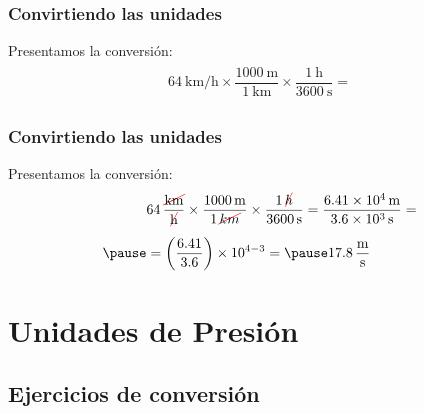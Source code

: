 \documentclass[14pt]{beamer}
\begin{document}
\begin{frame}
\frametitle{Convirtiendo las unidades}
Presentamos la conversión:
\pause
\begin{eqnarray*}
\begin{aligned}
\SI[per-mode=fraction]{64}{\kilo\meter\per\hour} \times \dfrac{\SI{1000}{\meter}}{\SI{1}{\kilo\meter}} \times \dfrac{\SI{1}{\hour}}{\SI{3600}{\second}} =
\end{aligned}
\end{eqnarray*}
\end{frame}
\begin{frame}
\frametitle{Convirtiendo las unidades}
Presentamos la conversión:
\begin{eqnarray*}
\begin{aligned}
&64 \, \dfrac{\Cancel[red]{\text{km}}}{\Cancel[red]{\text{h}}} \times \dfrac{\SI{1000}{\meter}}{\SI{1}{\Cancel[red]{\kilo\meter}}} \times \dfrac{\SI{1}{\Cancel[red]{\hour}}}{\SI{3600}{\second}} = \dfrac{\SI{6.41d4}{\meter}}{\SI{3.6d3}{\second}} = \\[0.5em] \pause
&= \left( \dfrac{6.41}{3.6} \right) \times 10^{4-3} = \pause \SI[per-mode=fraction]{17.8}{\meter\per\second}
\end{aligned}
\end{eqnarray*}
\end{frame}


\section{Unidades de Presión}
\subsection{Ejercicios de conversión}
\end{document}
